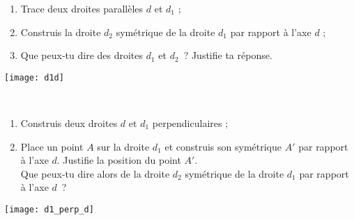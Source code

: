 
\begin{activite}

\begin{minipage}[c]{0.62\linewidth}
\begin{partie}
\begin{enumerate}
 \item Trace deux droites parallèles \textcolor{B2}{$d$} et $d_1$ ;
 \item Construis la droite $d_2$ symétrique de la droite $d_1$ par rapport à l'axe \textcolor{B2}{$d$} ;
 \item Que peux‑tu dire des droites $d_1$ et $d_2$ ? Justifie ta réponse.
 \end{enumerate}
\end{partie}
 \end{minipage}
   \qquad \begin{minipage}[c]{0.36\linewidth}
  \texttt{[image: d1d]}
  \end{minipage} \\


\begin{minipage}[c]{0.62\linewidth}
\begin{partie}
\begin{enumerate}
 \item Construis deux droites \textcolor{B2}{$d$} et $d_1$ perpendiculaires ;
 \item Place un point $A$ sur la droite $d_1$ et construis son symétrique $A'$ par rapport à l'axe \textcolor{B2}{$d$}. Justifie la position du point $A'$. \\[0.5em]
Que peux-tu dire alors de la droite $d_2$ symétrique de la droite $d_1$ par rapport à l'axe $d$ ?
 \end{enumerate}
\end{partie}
 \end{minipage}
   \qquad \begin{minipage}[c]{0.36\linewidth}
  \texttt{[image: d1\_perp\_d]}
  \end{minipage} \\

\end{activite}


